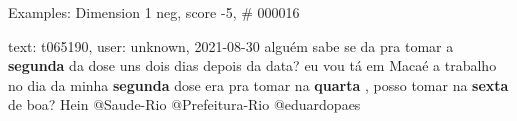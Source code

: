 \begin{frame}{Examples: Dimension 1 neg, score -5, \# 000016}
\footnotesize
\begin{alertblock}{text: t065190, user: unknown, 2021-08-30}
alguém sabe se da pra tomar a \textbf{segunda} da dose uns dois dias depois da 
data? \textbf{} eu vou tá em Macaé a trabalho no dia da 
minha \textbf{segunda} dose  era pra tomar na 
\textbf{quarta} , posso tomar na \textbf{sexta} de boa? Hein @Saude-Rio 
@Prefeitura-Rio @eduardopaes 
\end{alertblock}
\end{frame}
